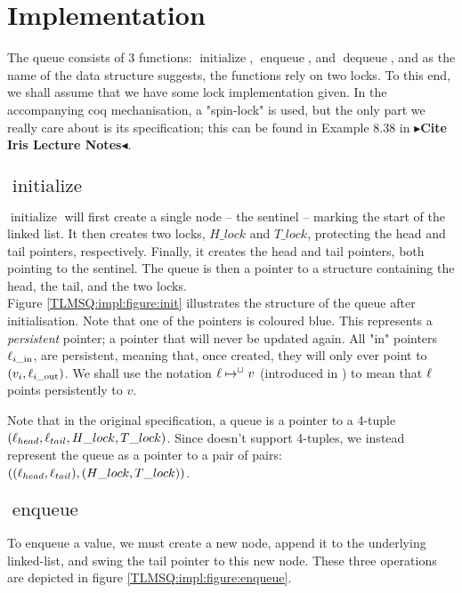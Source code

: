 \documentclass[twoside,11pt,openright]{report}
\newcommand{\initialise}{\operatorname{initialize}}
\newcommand{\enqueue}{\operatorname{enqueue}}
\newcommand{\dequeue}{\operatorname{dequeue}}
\newcommand{\locin}[1]{\loc_{#1\_\text{in}}}
\newcommand{\locout}[1]{\loc_{#1\_\text{out}}}
\newcommand{\todo}[1]{{\color[rgb]{.5,0,0}\textbf{$\blacktriangleright$#1$\blacktriangleleft$}}}
\begin{document}
\section{Implementation}
\label{TLMSQ:section:implementation}

The queue consists of 3 functions: $\initialise$, $\enqueue$, and $\dequeue$, and as the name of the data structure suggests, the functions rely on two locks. To this end, we shall assume that we have some lock implementation given. In the accompanying coq mechanisation, a "spin-lock" is used, but the only part we really care about is its specification; this can be found in Example 8.38 in \todo{Cite Iris Lecture Notes}.

\subsection[initialise]{$\initialise$}

$\initialise$ will first create a single node -- the sentinel -- marking the start of the linked list. It then creates two locks, $H\_lock$ and $T\_lock$, protecting the head and tail pointers, respectively. Finally, it creates the head and tail pointers, both pointing to the sentinel. The queue is then a pointer to a structure containing the head, the tail, and the two locks.\\
Figure \ref{TLMSQ:impl:figure:init} illustrates the structure of the queue after initialisation. Note that one of the pointers is coloured blue. This represents a \emph{persistent} pointer; a pointer that will never be updated again. All "in" pointers $\locin{i}$, are persistent, meaning that, once created, they will only ever point to $(v_i, \locout{i})$. We shall use the notation $\ell \mapsto^{\mathop{\Box}} v$ (introduced in \cite{DBLP:conf/cpp/VindumB21}) to mean that $\ell$ points persistently to $v$.

Note that in the original specification, a queue is a pointer to a 4-tuple $(\ell_{head}, \ell_{tail}, H\_lock, T\_lock)$. Since \heaplang doesn't support 4-tuples, we instead represent the queue as a pointer to a pair of pairs: $((\ell_{head}, \ell_{tail}), (H\_lock, T\_lock))$.


\subsection[enqueue]{$\enqueue$}

To enqueue a value, we must create a new node, append it to the underlying linked-list, and swing the tail pointer to this new node. These three operations are depicted in figure \ref{TLMSQ:impl:figure:enqueue}.
\end{document}
